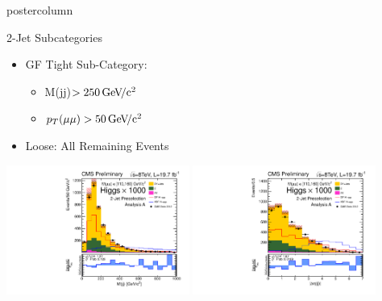 \documentclass[final,hyperref={pdfpagelabels=false}]{beamer}
\newcommand{\pt}{\ensuremath{p_T}}
\newcommand{\ptmm}{\ensuremath{\pt(\mu\mu)}}
\newcommand{\GeVcc}{\,\text{Ge\kern -0.1em  V\!/c}\ensuremath{\mathrm{^2}}}
\begin{document}
\begin{frame}
\begin{columns}
\begin{column}{.49\textwidth}
\begin{beamercolorbox}[center,wd=\textwidth]{postercolumn}
\begin{minipage}[T]{.95\textwidth}
{\begin{block}{2-Jet Subcategories}
\begin{itemize}
\begin{itemize}
                \end{itemize}
                \item GF Tight Sub-Category: 
                \begin{itemize}
                  \item M(jj)$>250\GeVcc{}$ 
                  \item $\ptmm>50\GeVcc{}$
                \end{itemize}
                \item Loose: All Remaining Events
              \end{itemize}
              \begin{center}
                \includegraphics[width=0.45\textwidth]{plotsPublic/controlPlots_analysisA/pdf/dijetMass_8TeV.pdf}
                \includegraphics[width=0.45\textwidth]{plotsPublic/controlPlots_analysisA/pdf/deltaEtaJets_8TeV.pdf}
              \end{center}
            \end{block}
          }
        \end{minipage}
      \end{beamercolorbox}
    \end{column}


\end{columns}
\end{frame}
\end{document}
